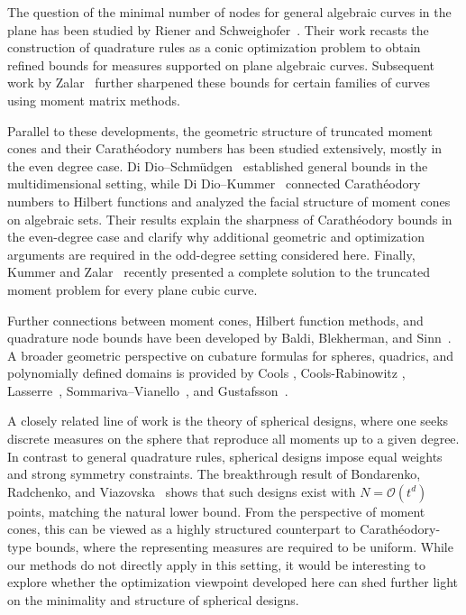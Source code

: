\documentclass[11pt,a4paper]{amsart}
\numberwithin{equation}{section}
\theoremstyle{definition}
\numberwithin{thm}{section}
\theoremstyle{break}
\numberwithin{subcase}{case}
\begin{document}
The question of the minimal number of nodes for general algebraic curves in the plane has been studied by  Riener and Schweighofer~\cite{RS}. Their work recasts the construction of quadrature rules as a conic optimization problem to obtain refined bounds for measures supported on plane algebraic curves.  Subsequent work by Zalar~\cite{zalar} further sharpened these bounds for certain families of curves using moment matrix methods.  

Parallel to these developments, the geometric structure of truncated moment cones and their Carathéodory numbers has been studied extensively, mostly in the even degree case.  Di Dio–Schmüdgen~\cite{diDioSchmudgen2018} established general bounds in the multidimensional setting, while Di Dio–Kummer~\cite{diDioKummer2021} connected Carathéodory numbers to Hilbert functions and analyzed the facial structure of moment cones on algebraic sets. Their results explain the sharpness of Carathéodory bounds in the even-degree case and clarify why additional geometric and optimization arguments are required in the odd-degree setting considered here. Finally, Kummer and Zalar~\cite{kummer2025positivepolynomialstruncatedmoment} recently presented a complete solution to the truncated moment problem for every plane cubic curve.

Further connections between moment cones, Hilbert function methods, and quadrature node bounds have been developed by Baldi, Blekherman, and Sinn~\cite{BaldiBlekhermanSinn2024}. A broader geometric perspective on cubature formulas for spheres, quadrics, and polynomially defined domains is provided by Cools \cite{Cools_1997, COOLS199921}, Cools-Rabinowitz \cite{COOLS1993309}, Lasserre~\cite{Lasserre2011,Lasserre2012}, Sommariva–Vianello~\cite{SommarivaVianello2020}, and Gustafsson~\cite{Gustafsson2023}.

{
A closely related line of work is the theory of spherical designs, where one seeks discrete measures on the sphere that reproduce all moments up to a given degree. In contrast to general quadrature rules, spherical designs impose equal weights and strong symmetry constraints. The breakthrough result of Bondarenko, Radchenko, and Viazovska~\cite{bondarenko2013optimal} shows that such designs exist with $N = \mathcal{O}(t^d)$ points, matching the natural lower bound. From the perspective of moment cones, this can be viewed as a highly structured counterpart to Carathéodory-type bounds, where the representing measures are required to be uniform. While our methods do not directly apply in this setting, it would be interesting to explore whether the optimization viewpoint developed here can shed further light on the minimality and structure of spherical designs.}
\end{document}
